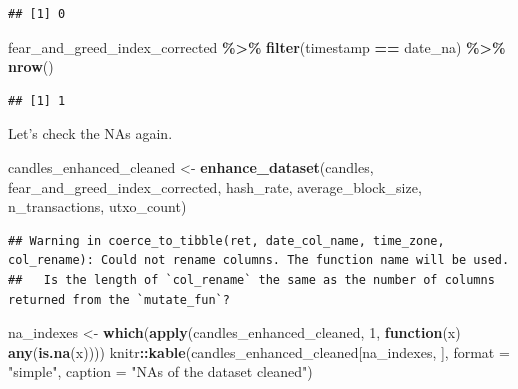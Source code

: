 \documentclass[
]{article}
\newenvironment{Shaded}{\begin{snugshade}}{\end{snugshade}}
\newcommand{\AttributeTok}[1]{\textcolor[rgb]{0.13,0.29,0.53}{#1}}
\newcommand{\ControlFlowTok}[1]{\textcolor[rgb]{0.13,0.29,0.53}{\textbf{#1}}}
\newcommand{\DecValTok}[1]{\textcolor[rgb]{0.00,0.00,0.81}{#1}}
\newcommand{\FunctionTok}[1]{\textcolor[rgb]{0.13,0.29,0.53}{\textbf{#1}}}
\newcommand{\NormalTok}[1]{#1}
\newcommand{\OtherTok}[1]{\textcolor[rgb]{0.56,0.35,0.01}{#1}}
\newcommand{\SpecialCharTok}[1]{\textcolor[rgb]{0.81,0.36,0.00}{\textbf{#1}}}
\newcommand{\StringTok}[1]{\textcolor[rgb]{0.31,0.60,0.02}{#1}}
\begin{document}
\begin{verbatim}
## [1] 0
\end{verbatim}

\begin{Shaded}
\begin{Highlighting}[]
\NormalTok{fear\_and\_greed\_index\_corrected }\SpecialCharTok{\%\textgreater{}\%}
    \FunctionTok{filter}\NormalTok{(timestamp }\SpecialCharTok{==}\NormalTok{ date\_na) }\SpecialCharTok{\%\textgreater{}\%}
    \FunctionTok{nrow}\NormalTok{()}
\end{Highlighting}
\end{Shaded}

\begin{verbatim}
## [1] 1
\end{verbatim}

Let's check the NAs again.

\begin{Shaded}
\begin{Highlighting}[]
\NormalTok{candles\_enhanced\_cleaned }\OtherTok{\textless{}{-}} \FunctionTok{enhance\_dataset}\NormalTok{(candles, fear\_and\_greed\_index\_corrected,}
\NormalTok{    hash\_rate, average\_block\_size, n\_transactions, utxo\_count)}
\end{Highlighting}
\end{Shaded}

\begin{verbatim}
## Warning in coerce_to_tibble(ret, date_col_name, time_zone, col_rename): Could not rename columns. The function name will be used. 
##   Is the length of `col_rename` the same as the number of columns returned from the `mutate_fun`?
\end{verbatim}

\begin{Shaded}
\begin{Highlighting}[]
\NormalTok{na\_indexes }\OtherTok{\textless{}{-}} \FunctionTok{which}\NormalTok{(}\FunctionTok{apply}\NormalTok{(candles\_enhanced\_cleaned, }\DecValTok{1}\NormalTok{, }\ControlFlowTok{function}\NormalTok{(x) }\FunctionTok{any}\NormalTok{(}\FunctionTok{is.na}\NormalTok{(x))))}
\NormalTok{knitr}\SpecialCharTok{::}\FunctionTok{kable}\NormalTok{(candles\_enhanced\_cleaned[na\_indexes, ], }\AttributeTok{format =} \StringTok{"simple"}\NormalTok{,}
    \AttributeTok{caption =} \StringTok{"NAs of the dataset cleaned"}\NormalTok{)}
\end{Highlighting}
\end{Shaded}
\end{document}
